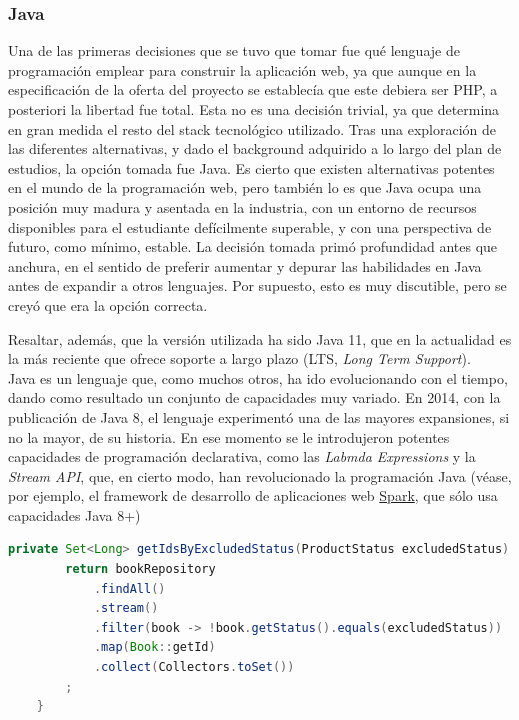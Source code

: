 \documentclass[a4paper]{article}
\begin{document}
	\subsubsection{Java}
	Una de las primeras decisiones que se tuvo que tomar fue qué lenguaje de programación emplear para construir la aplicación web, ya que aunque en la especificación de la oferta del proyecto se establecía que este debiera ser PHP, a posteriori la libertad fue total. Esta no es una decisión trivial, ya que determina en gran medida el resto del stack tecnológico utilizado. Tras una exploración de las diferentes alternativas, y dado el background adquirido a lo largo del plan de estudios, la opción tomada fue Java. Es cierto que existen alternativas potentes en el mundo de la programación web, pero también lo es que Java ocupa una posición muy madura y asentada en la industria, con un entorno de recursos disponibles para el estudiante defícilmente superable, y con una perspectiva de futuro, como mínimo, estable. La decisión tomada primó profundidad antes que anchura, en el sentido de preferir aumentar y depurar las habilidades en Java antes de expandir a otros lenguajes. Por supuesto, esto es muy discutible, pero se creyó que era la opción correcta.
	
	Resaltar, además, que la versión utilizada ha sido Java 11, que en la actualidad es la más reciente que ofrece soporte a largo plazo (LTS, \emph{Long Term Support}).
	\\
	
	Java es un lenguaje que, como muchos otros, ha ido evolucionando con el tiempo, dando como resultado un conjunto de capacidades muy variado. En 2014, con la publicación de Java 8, el lenguaje experimentó una de las mayores expansiones, si no la mayor, de su historia. En ese momento se le introdujeron potentes capacidades de programación declarativa, como las \emph{Labmda Expressions} y la \emph{Stream API}, que, en cierto modo, han revolucionado la programación Java (véase, por ejemplo, el framework de desarrollo de aplicaciones web \href{http://sparkjava.com/}{Spark}, que sólo usa capacidades Java 8+)
	\\
	
	\begin{lstlisting}[language=Java,caption=Programación declarativa con Java,label=list:java_declarative]
	private Set<Long> getIdsByExcludedStatus(ProductStatus excludedStatus) {
		return bookRepository
			.findAll()
			.stream()
			.filter(book -> !book.getStatus().equals(excludedStatus))
			.map(Book::getId)
			.collect(Collectors.toSet())
		;
	}
	\end{lstlisting}
	
\end{document}
